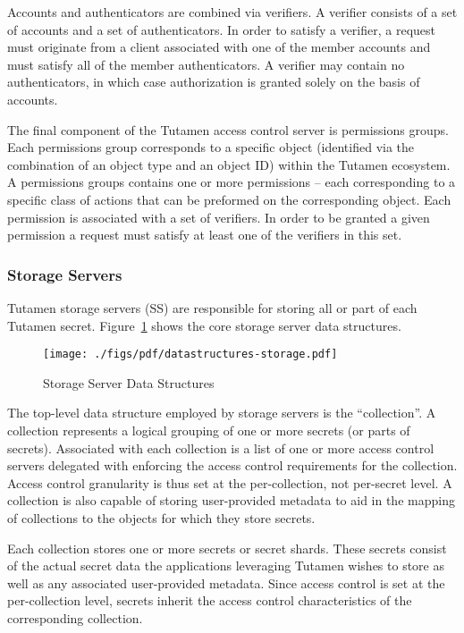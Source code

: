 Accounts and authenticators are combined via verifiers. A verifier
consists of a set of accounts and a set of authenticators. In order to
satisfy a verifier, a request must originate from a client associated
with one of the member accounts and must satisfy all of the member
authenticators. A verifier may contain no authenticators, in which
case authorization is granted solely on the basis of accounts.

The final component of the Tutamen access control server is
permissions groups. Each permissions group corresponds to a specific
object (identified via the combination of an object type and an object
ID) within the Tutamen ecosystem. A permissions groups contains one or
more permissions -- each corresponding to a specific class of actions
that can be preformed on the corresponding object. Each permission is
associated with a set of verifiers. In order to be granted a given
permission a request must satisfy at least one of the verifiers in
this set.

\subsubsection{Storage Servers}
\label{sec:tutamen:arch:ss}

Tutamen storage servers (SS) are responsible for storing all or part
of each Tutamen secret. Figure~\ref{fig:tutamen:storagestructs} shows
the core storage server data structures.

\begin{figure}[th]
  \centering
  \texttt{[image: ./figs/pdf/datastructures-storage.pdf]}
  \caption{Storage Server Data Structures}
  \label{fig:tutamen:storagestructs}
\end{figure}

The top-level data structure employed by storage servers is the
``collection''. A collection represents a logical grouping of one or
more secrets (or parts of secrets). Associated with each collection is
a list of one or more access control servers delegated with enforcing
the access control requirements for the collection. Access control
granularity is thus set at the per-collection, not per-secret level. A
collection is also capable of storing user-provided metadata to aid in
the mapping of collections to the objects for which they store
secrets.

Each collection stores one or more secrets or secret shards. These
secrets consist of the actual secret data the applications leveraging
Tutamen wishes to store as well as any associated user-provided
metadata. Since access control is set at the per-collection level,
secrets inherit the access control characteristics of the
corresponding collection.


